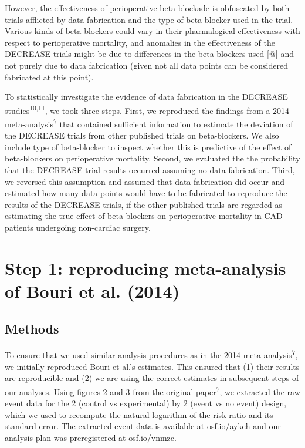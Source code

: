 \documentclass[]{article}
\begin{document}
However, the effectiveness of perioperative beta-blockade is obfuscated
by both trials afflicted by data fabrication and the type of
beta-blocker used in the trial. Various kinds of beta-blockers could
vary in their pharmalogical effectiveness with respect to perioperative
mortality, and anomalies in the effectiveness of the DECREASE trials
might be due to differences in the beta-blockers used {[}@{]} and not
purely due to data fabrication (given not all data points can be
considered fabricated at this point).

To statistically investigate the evidence of data fabrication in the
DECREASE studies\textsuperscript{10,11}, we took three steps. First, we
reproduced the findings from a 2014 meta-analysis\textsuperscript{7}
that contained sufficient information to estimate the deviation of the
DECREASE trials from other published trials on beta-blockers. We also
include type of beta-blocker to inspect whether this is predictive of
the effect of beta-blockers on perioperative mortality. Second, we
evaluated the the probability that the DECREASE trial results occurred
assuming no data fabrication. Third, we reversed this assumption and
assumed that data fabrication did occur and estimated how many data
points would have to be fabricated to reproduce the results of the
DECREASE trials, if the other published trials are regarded as
estimating the true effect of beta-blockers on perioperative mortality
in CAD patients undergoing non-cardiac surgery.

\section{Step 1: reproducing meta-analysis of Bouri et al.
(2014)}\label{step-1-reproducing-meta-analysis-of-bouri-et-al.-2014}

\subsection{Methods}\label{methods}

To ensure that we used similar analysis procedures as in the 2014
meta-analysis\textsuperscript{7}, we initially reproduced Bouri et al.'s
estimates. This ensured that (1) their results are reproducible and (2)
we are using the correct estimates in subsequent steps of our analyses.
Using figures 2 and 3 from the original paper\textsuperscript{7}, we
extracted the raw event data for the 2 (control vs experimental) by 2
(event vs no event) design, which we used to recompute the natural
logarithm of the risk ratio and its standard error. The extracted event
data is available at \href{https://osf.io/aykeh}{osf.io/aykeh} and our
analysis plan was preregistered at
\href{https://osf.io/vnmzc}{osf.io/vnmzc}.
\end{document}
